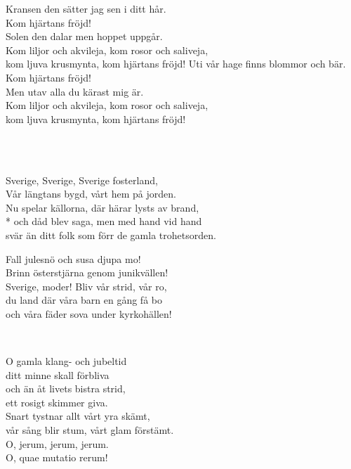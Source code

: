 Kransen den sätter jag sen i ditt hår.\\
Kom hjärtans fröjd!\\
Solen den dalar men hoppet uppgår.\\
Kom liljor och akvileja, kom rosor och saliveja,\\
kom ljuva krusmynta, kom hjärtans fröjd!
\newpage
Uti vår hage finns blommor och bär.\\
Kom hjärtans fröjd!\\
Men utav alla du kärast mig är.\\
Kom liljor och akvileja, kom rosor och saliveja,\\
kom ljuva krusmynta, kom hjärtans fröjd!

 \\

 \\
\author{Text: Verner von Heidenstam}

\songtext{} Sverige, Sverige, Sverige fosterland,\\
Vår längtans bygd, vårt hem på jorden.\\
Nu spelar källorna, där härar lysts av brand,\\*
och dåd blev saga, men med hand vid hand\\
svär än ditt folk som förr de gamla trohetsorden.

Fall julesnö och susa djupa mo!\\
Brinn österstjärna genom junikvällen!\\
Sverige, moder! Bliv vår strid, vår ro,\\
du land där våra barn en gång få bo\\
och våra fäder sova under kyrkohällen!


\newpage

 \\
\author{Svensk text: August Lindh}

\songtext{} O gamla klang- och jubeltid\\
ditt minne skall förbliva\\
och än åt livets bistra strid,\\
ett rosigt skimmer giva.\\
Snart tystnar allt vårt yra skämt,\\
vår sång blir stum, vårt glam förstämt.\\
O, jerum, jerum, jerum.\\
O, quae mutatio rerum!

